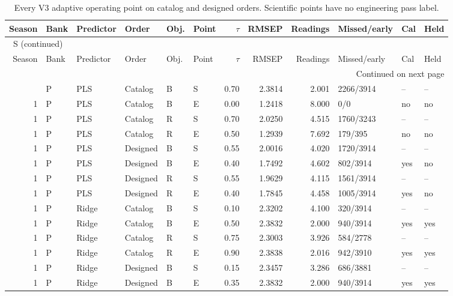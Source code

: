 \documentclass[10pt,a4paper]{article}
\renewcommand{\thetable}{S\arabic{table}}
\begin{document}
\clearpage
\begin{landscape}
\begingroup\footnotesize
\setlength{\tabcolsep}{3.5pt}
\renewcommand{\arraystretch}{1.10}
\begin{longtable}{rlllllrrrlll}
\caption{Every V3 adaptive operating point on catalog and designed orders. Scientific points have no engineering pass label.}\label{tab:v3adaptive}\\
\toprule
Season & Bank & Predictor & Order & Obj. & Point & $\tau$ & RMSEP & Readings & Missed/early & Cal & Held \\
\midrule
\endfirsthead
\multicolumn{12}{l}{\tablename~\thetable{} (continued)}\\
\toprule
Season & Bank & Predictor & Order & Obj. & Point & $\tau$ & RMSEP & Readings & Missed/early & Cal & Held \\
\midrule
\endhead
\midrule
\multicolumn{12}{r}{Continued on next page}\\
\endfoot
\bottomrule
\endlastfoot
1 & P & PLS & Catalog & B & S & 0.70 & 2.3814 & 2.001 & 2266/3914 & -- & -- \\
1 & P & PLS & Catalog & B & E & 0.00 & 1.2418 & 8.000 & 0/0 & no & no \\
1 & P & PLS & Catalog & R & S & 0.70 & 2.0250 & 4.515 & 1760/3243 & -- & -- \\
1 & P & PLS & Catalog & R & E & 0.50 & 1.2939 & 7.692 & 179/395 & no & no \\
1 & P & PLS & Designed & B & S & 0.55 & 2.0016 & 4.020 & 1720/3914 & -- & -- \\
1 & P & PLS & Designed & B & E & 0.40 & 1.7492 & 4.602 & 802/3914 & yes & no \\
1 & P & PLS & Designed & R & S & 0.55 & 1.9629 & 4.115 & 1561/3914 & -- & -- \\
1 & P & PLS & Designed & R & E & 0.40 & 1.7845 & 4.458 & 1005/3914 & yes & no \\
1 & P & Ridge & Catalog & B & S & 0.10 & 2.3202 & 4.100 & 320/3914 & -- & -- \\
1 & P & Ridge & Catalog & B & E & 0.50 & 2.3832 & 2.000 & 940/3914 & yes & yes \\
1 & P & Ridge & Catalog & R & S & 0.75 & 2.3003 & 3.926 & 584/2778 & -- & -- \\
1 & P & Ridge & Catalog & R & E & 0.90 & 2.3838 & 2.016 & 942/3910 & yes & yes \\
1 & P & Ridge & Designed & B & S & 0.15 & 2.3457 & 3.286 & 686/3881 & -- & -- \\
1 & P & Ridge & Designed & B & E & 0.35 & 2.3832 & 2.000 & 940/3914 & yes & yes \\

\end{longtable}
\end{landscape}
\end{document}
